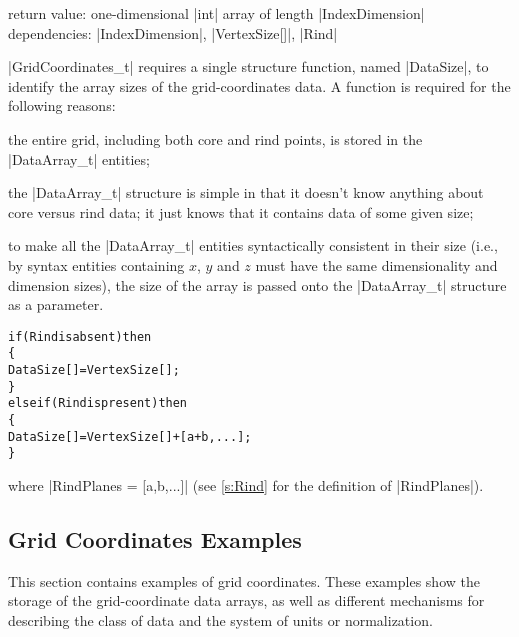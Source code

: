 \noindent return value: one-dimensional |int| array of length
                        |IndexDimension| \\
\noindent dependencies: |IndexDimension|, |VertexSize[]|, |Rind|

|GridCoordinates_t| requires a single structure function, named |DataSize|,
to identify the array sizes of the grid-coordinates data.  A function is 
required for the following reasons:
\begin{myitemize}
\item
 the entire grid, including both core and rind points, is stored in 
 the |DataArray_t| entities;
\item
 the |DataArray_t| structure is simple in that it doesn't know anything
 about core versus rind data; it just knows that it contains data 
 of some given size;
\item
 to make all the |DataArray_t| entities syntactically consistent in
 their size (i.e., by syntax entities containing $x$, $y$ and $z$ must
 have the same dimensionality and dimension sizes), the size of the
 array is passed onto the |DataArray_t| structure as a parameter.
\end{myitemize}

\begin{alltt}
  if (Rind is absent) then
    \{
    DataSize[] = VertexSize[] ;
    \}
  else if (Rind is present) then
    \{ 
    DataSize[] = VertexSize[] + [a + b,...] ;
    \}
\end{alltt}
where |RindPlanes = [a,b,...]| (see \autoref{s:Rind} 
for the definition of |RindPlanes|). 

\subsection{Grid Coordinates Examples}
\label{s:grid_example}

This section contains examples of grid coordinates.  These examples
show the storage of the grid-coordinate data arrays, as well as different
mechanisms for describing the class of data and the system of units or
normalization.

